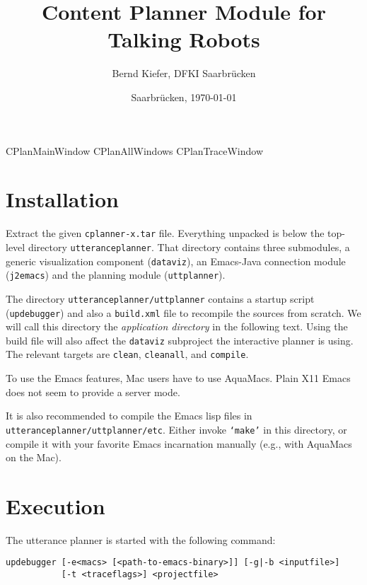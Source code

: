 \documentclass[11pt,a4paper]{article}
\title{\Large \bf Content Planner Module for Talking Robots}
\date{Saarbr\"ucken, \today}
\author{Bernd Kiefer, DFKI Saarbr\"ucken}
\begin{document}
\maketitle
\setlength{\parindent}{0em}

{CPlanMainWindow}
{CPlanAllWindows}
{CPlanTraceWindow}

\section{Installation}

Extract the given \texttt{cplanner-x.tar} file. Everything unpacked is below
the top-level directory \texttt{utteranceplanner}. That directory contains
three submodules, a generic visualization component (\texttt{dataviz}), an
Emacs-Java connection module (\texttt{j2emacs}) and the planning module
(\texttt{uttplanner}).

The directory \texttt{utteranceplanner/uttplanner} contains a startup script
(\texttt{updebugger}) and also a \texttt{build.xml} file to recompile the
sources from scratch. We will call this directory the \emph{application
  directory} in the following text. Using the build file will also affect the
\texttt{dataviz} subproject the interactive planner is using. The relevant
targets are \texttt{clean}, \texttt{cleanall}, and \texttt{compile}.

To use the Emacs features, Mac users have to use AquaMacs. Plain X11 Emacs
does not seem to provide a server mode.

It is also recommended to compile the Emacs lisp files in \texttt{utteranceplanner/uttplanner/etc}. Either invoke
\texttt{`make'} in this directory, or compile it with your favorite Emacs
incarnation manually (e.g., with AquaMacs on the Mac).

\section{Execution}

The utterance planner is started with the following command:
\begin{verbatim}
updebugger [-e<macs> [<path-to-emacs-binary>]] [-g|-b <inputfile>]
           [-t <traceflags>] <projectfile>
\end{verbatim}
\end{document}
